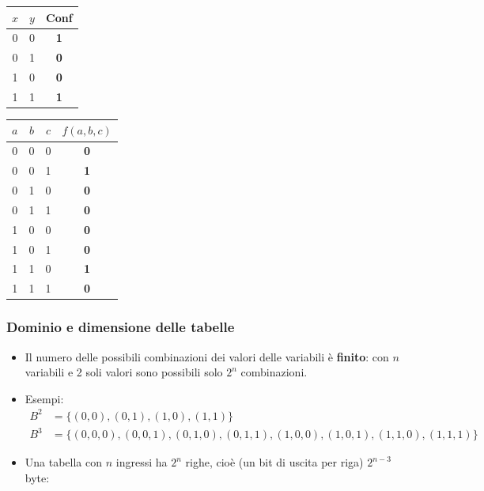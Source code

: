 \documentclass[12pt, a4paper]{article}
\begin{document}
\begin{center}
\renewcommand{\arraystretch}{1.25}
\begin{tabular}[t]{|cc||c|}
\hline
\colorbox{gray!25}{\color{black}$x$} & \colorbox{gray!25}{\color{black}$y$} & \colorbox{gray!25}{\color{black}\textbf{Conf}} \\ \hline
0 & 0 & \textbf{1} \\ \hline
0 & 1 & \textbf{0} \\ \hline
1 & 0 & \textbf{0} \\ \hline
1 & 1 & \textbf{1} \\ \hline
\end{tabular}
\qquad
\begin{tabular}[t]{|ccc||c|}
\hline
\colorbox{gray!25}{\color{black}$a$} & \colorbox{gray!25}{\color{black}$b$} & \colorbox{gray!25}{\color{black}$c$} & \colorbox{gray!25}{\color{black}$f(a,b,c)$} \\ \hline
0 & 0 & 0 & \textbf{0} \\ \hline
0 & 0 & 1 & \textbf{1} \\ \hline
0 & 1 & 0 & \textbf{0} \\ \hline
0 & 1 & 1 & \textbf{0} \\ \hline
1 & 0 & 0 & \textbf{0} \\ \hline
1 & 0 & 1 & \textbf{0} \\ \hline
1 & 1 & 0 & \textbf{1} \\ \hline
1 & 1 & 1 & \textbf{0} \\ \hline
\end{tabular}
\end{center}

\subsubsection{Dominio e dimensione delle tabelle}
\begin{itemize}
    \item Il numero delle possibili combinazioni dei valori delle variabili è \textbf{finito}: con $n$ variabili e 2 soli valori sono possibili solo $2^n$ combinazioni.
    \item Esempi:
    \begin{align*}
    B^2 &= \{(0,0), (0,1), (1,0), (1,1)\} \\
    B^3 &= \{(0,0,0), (0,0,1), (0,1,0), (0,1,1), (1,0,0), (1,0,1), (1,1,0), (1,1,1)\}
    \end{align*}
    \item Una tabella con $n$ ingressi ha $2^n$ righe, cioè (un bit di uscita per riga) $2^{n-3}$ byte:
\end{itemize}
\end{document}
